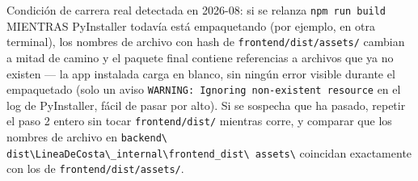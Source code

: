 \begin{warnbox}
Condición de carrera real detectada en 2026-08: si se relanza \texttt{npm run build} MIENTRAS
PyInstaller todavía está empaquetando (por ejemplo, en otra terminal), los nombres de archivo
con hash de \texttt{frontend/dist/assets/} cambian a mitad de camino y el paquete final
contiene referencias a archivos que ya no existen — la app instalada carga en blanco, sin
ningún error visible durante el empaquetado (solo un aviso \texttt{WARNING: Ignoring
non-existent resource} en el log de PyInstaller, fácil de pasar por alto). Si se sospecha que
ha pasado, repetir el paso 2 entero sin tocar \texttt{frontend/dist/} mientras corre, y
comparar que los nombres de archivo en \texttt{backend\textbackslash
dist\textbackslash LineaDeCosta\textbackslash \_internal\textbackslash frontend\_dist\textbackslash
assets\textbackslash} coincidan exactamente con los de \texttt{frontend/dist/assets/}.
\end{warnbox}

